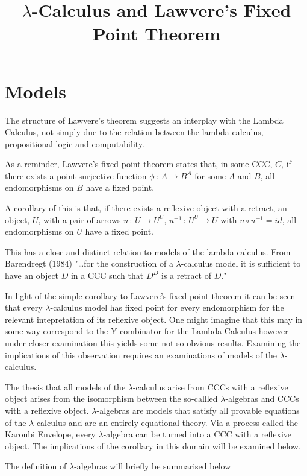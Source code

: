 \documentclass[a4paper,10pt]{article}
\title{$\lambda$-Calculus and Lawvere's Fixed Point Theorem}
\date{}
\begin{document}
\maketitle
\vspace{-20mm}
\section{Models}
The structure of Lawvere's theorem suggests an interplay with the Lambda
Calculus, not simply due to the relation between the lambda calculus,
propositional logic and computability.

As a reminder, Lawvere's fixed point theorem states that, in some CCC, $C$, if
there exists a point-surjective function $\phi \, : \, A \rightarrow B^A$ for
some $A$ and $B$, all endomorphisms on $B$ have a fixed point.

A corollary of this is that, if there exists a reflexive object with a retract,
an object, $U$,  with a pair of arrows $u \, : \, U \rightarrow U^U$, $u^{-1} \,
: \, U^U \rightarrow U$ with $u \circ u^{-1} = id$, all endomorphisms on $U$
have a fixed point.

This has a close and distinct relation to models of the lambda calculus. From
Barendregt (1984) "\ldots for the construction of a $\lambda$-calculus model it
is sufficient to have an object $D$ in a CCC such that $D^D$ is a retract of
$D$."

In light of the simple corollary to Lawvere's fixed point theorem it can be seen
that every $\lambda$-calculus model has fixed point for every endomorphism for
the relevant intepretation of its reflexive object. One might imagine that this
may in some way correspond to the Y-combinator for the Lambda Calculus however
under closer examination this yields some not so obvious results. Examining the
implications of this observation requires an examinations of models of the
$\lambda$-calculus.

The thesis that all models of the $\lambda$-calculus arise from CCCs with a
reflexive object arises from the isomorphism between the so-callled
$\lambda$-algebras and CCCs with a reflexive object. $\lambda$-algebras are
models that satisfy  all provable equations of the $\lambda$-calculus and are an
entirely equational theory. Via a process called the Karoubi Envelope, every
$\lambda$-algebra can be turned into a CCC with a reflexive object. The
implications of the corollary in this domain will be examined below.

The definition of $\lambda$-algebras will briefly be summarised below
\end{document}
